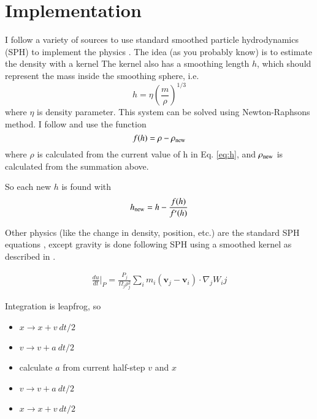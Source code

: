 \documentclass[12pt]{article}
\begin{document}
\section{Implementation}
I follow a variety of sources to use standard smoothed particle hydrodynamics (SPH) to implement the physics \citep{monaghan92,monaghan05,PM07,phantom,dwarf,price12,gadget}.
The idea (as you probably know) is to estimate the density with a kernel
The kernel also has a smoothing length $h$, which should represent the mass inside the smoothing sphere, i.e.
\begin{equation} \label{eq:h}
    h = \eta\left(\frac{m}{\rho}\right)^{1/3}
\end{equation}
where $\eta$ is  density parameter. This system can be solved using Newton-Raphsons method. I follow \citet{monaghan05} and use the function 
\begin{equation}
    f(h) = \rho - \rho_{\rm new}
\end{equation}
where $\rho$ is calculated from the current value of h in Eq. \ref{eq:h}, and $\rho_{\rm new}$ is calculated from the summation above.

So each new $h$ is found with
\begin{equation}
    h_{\rm new} = h - \frac{f(h)}{f'(h)}
\end{equation}


Other physics (like the change in density, position, etc.) are the standard SPH equations \citep{monaghan05, monaghan92}, except gravity is done following SPH using a smoothed kernel as described in \citet{PM07}.

\begin{align}
\frac{du}{dt} \Bigg\vert_{P} = \frac{P_j}{\Omega_j\rho_j^2} \sum_i m_i (\mathbf{v}_j - \mathbf{v}_i) \cdot \nabla_j W_ij
\end{align}

Integration is leapfrog, so 
\begin{itemize}
    \item $x \to x + v~dt/2$
    \item $v \to v + a~dt/2$
    \item calculate $a$ from current half-step $v$ and $x$
    \item $v \to v + a~dt/2$
    \item $x \to x + v~dt/2$
\end{itemize}



\newpage


\end{document}
